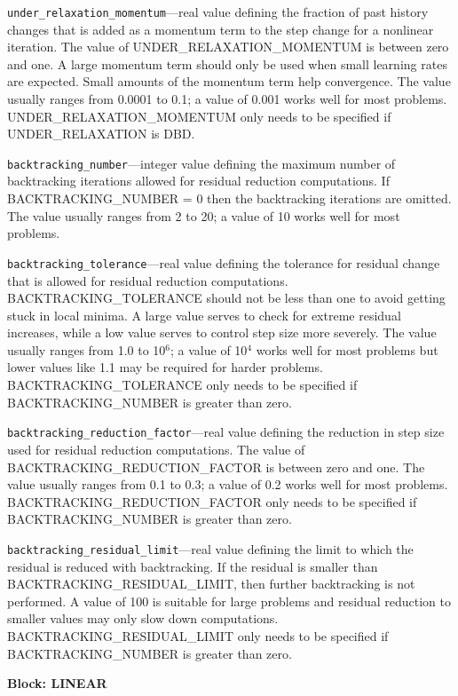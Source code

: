 \begin{description}
\item \texttt{under\_relaxation\_momentum}---real value defining the fraction of past history changes that is added as a momentum term to the step change for a nonlinear iteration. The value of UNDER\_RELAXATION\_MOMENTUM is between zero and one. A large momentum term should only be used when small learning rates are expected. Small amounts of the momentum term help convergence. The value usually ranges from 0.0001 to 0.1; a value of 0.001 works well for most problems. UNDER\_RELAXATION\_MOMENTUM only needs to be specified if UNDER\_RELAXATION is DBD.

\item \texttt{backtracking\_number}---integer value defining the maximum number of backtracking iterations allowed for residual reduction computations. If BACKTRACKING\_NUMBER = 0 then the backtracking iterations are omitted. The value usually ranges from 2 to 20; a value of 10 works well for most problems.

\item \texttt{backtracking\_tolerance}---real value defining the tolerance for residual change that is allowed for residual reduction computations. BACKTRACKING\_TOLERANCE should not be less than one to avoid getting stuck in local minima. A large value serves to check for extreme residual increases, while a low value serves to control step size more severely. The value usually ranges from 1.0 to 10$^6$; a value of 10$^4$ works well for most problems but lower values like 1.1 may be required for harder problems. BACKTRACKING\_TOLERANCE only needs to be specified if BACKTRACKING\_NUMBER is greater than zero.

\item \texttt{backtracking\_reduction\_factor}---real value defining the reduction in step size used for residual reduction computations. The value of BACKTRACKING\_REDUCTION\_FACTOR is between zero and one. The value usually ranges from 0.1 to 0.3; a value of 0.2 works well for most problems. BACKTRACKING\_REDUCTION\_FACTOR only needs to be specified if BACKTRACKING\_NUMBER is greater than zero.

\item \texttt{backtracking\_residual\_limit}---real value defining the limit to which the residual is reduced with backtracking. If the residual is smaller than BACKTRACKING\_RESIDUAL\_LIMIT, then further backtracking is not performed. A value of 100 is suitable for large problems and residual reduction to smaller values may only slow down computations. BACKTRACKING\_RESIDUAL\_LIMIT only needs to be specified if BACKTRACKING\_NUMBER is greater than zero.

\end{description}
\item \textbf{Block: LINEAR}


